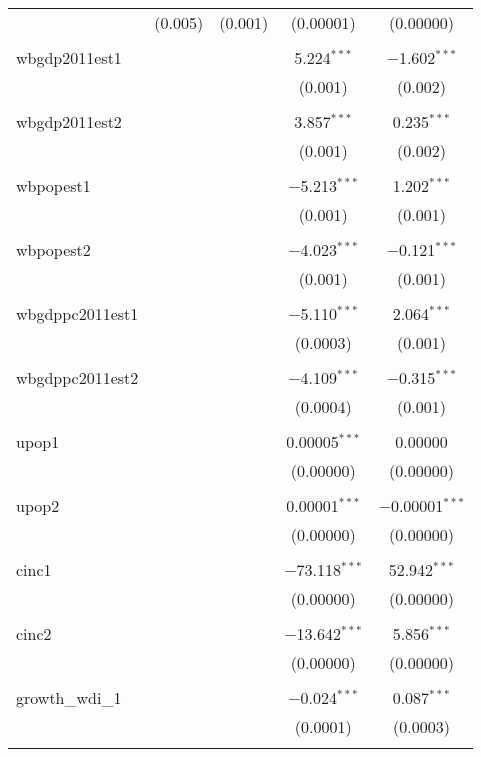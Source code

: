 \begin{table}[!htbp]
\begin{tabular}{@{\extracolsep{5pt}}lcccc}
  & (0.005) & (0.001) & (0.00001) & (0.00000) \\ 
  & & & & \\ 
 wbgdp2011est1 &  &  & 5.224$^{***}$ & $-$1.602$^{***}$ \\ 
  &  &  & (0.001) & (0.002) \\ 
  & & & & \\ 
 wbgdp2011est2 &  &  & 3.857$^{***}$ & 0.235$^{***}$ \\ 
  &  &  & (0.001) & (0.002) \\ 
  & & & & \\ 
 wbpopest1 &  &  & $-$5.213$^{***}$ & 1.202$^{***}$ \\ 
  &  &  & (0.001) & (0.001) \\ 
  & & & & \\ 
 wbpopest2 &  &  & $-$4.023$^{***}$ & $-$0.121$^{***}$ \\ 
  &  &  & (0.001) & (0.001) \\ 
  & & & & \\ 
 wbgdppc2011est1 &  &  & $-$5.110$^{***}$ & 2.064$^{***}$ \\ 
  &  &  & (0.0003) & (0.001) \\ 
  & & & & \\ 
 wbgdppc2011est2 &  &  & $-$4.109$^{***}$ & $-$0.315$^{***}$ \\ 
  &  &  & (0.0004) & (0.001) \\ 
  & & & & \\ 
 upop1 &  &  & 0.00005$^{***}$ & 0.00000 \\ 
  &  &  & (0.00000) & (0.00000) \\ 
  & & & & \\ 
 upop2 &  &  & 0.00001$^{***}$ & $-$0.00001$^{***}$ \\ 
  &  &  & (0.00000) & (0.00000) \\ 
  & & & & \\ 
 cinc1 &  &  & $-$73.118$^{***}$ & 52.942$^{***}$ \\ 
  &  &  & (0.00000) & (0.00000) \\ 
  & & & & \\ 
 cinc2 &  &  & $-$13.642$^{***}$ & 5.856$^{***}$ \\ 
  &  &  & (0.00000) & (0.00000) \\ 
  & & & & \\ 
 growth\_wdi\_1 &  &  & $-$0.024$^{***}$ & 0.087$^{***}$ \\ 
  &  &  & (0.0001) & (0.0003) \\ 
  & & & & \\ 

\end{tabular}
\end{table}
